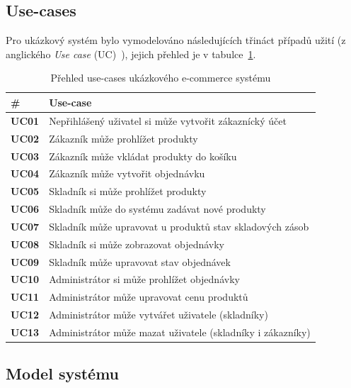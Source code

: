 \subsection{Use-cases}

Pro ukázkový systém bylo vymodelováno následujících třináct případů užití
(z anglického \textit{Use case} (\gls{UC})~\cite{bittner2002use}), jejich
přehled je v tabulce~\ref{tbl:use-cases}.

\begin{table}
    \centering
    \begin{tabular}{ l l }
        \hline
        \textbf{\#} & \textbf{Use-case} \\
        \hline \hline
        \textbf{UC01} & Nepřihlášený uživatel si může vytvořit zákaznícký účet \\
        \textbf{UC02} & Zákazník může prohlížet produkty \\
        \textbf{UC03} & Zákazník může vkládat produkty do košíku \\
        \textbf{UC04} & Zákazník může vytvořit objednávku \\
        \textbf{UC05} & Skladník si může prohlížet produkty \\
        \textbf{UC06} & Skladník může do systému zadávat nové produkty \\
        \textbf{UC07} & Skladník může upravovat u produktů stav skladových zásob \\
        \textbf{UC08} & Skladník si může zobrazovat objednávky \\
        \textbf{UC09} & Skladník může upravovat stav objednávek \\
        \textbf{UC10} & Administrátor si může prohlížet objednávky \\
        \textbf{UC11} & Administrátor může upravovat cenu produktů \\
        \textbf{UC12} & Administrátor může vytvářet uživatele (skladníky) \\
        \textbf{UC13} & Administrátor může mazat uživatele (skladníky i zákazníky) \\
        \hline
    \end{tabular}
    \caption{Přehled use-cases ukázkového e-commerce systému}
    \label{tbl:use-cases}
\end{table}

\subsection{Model systému}

